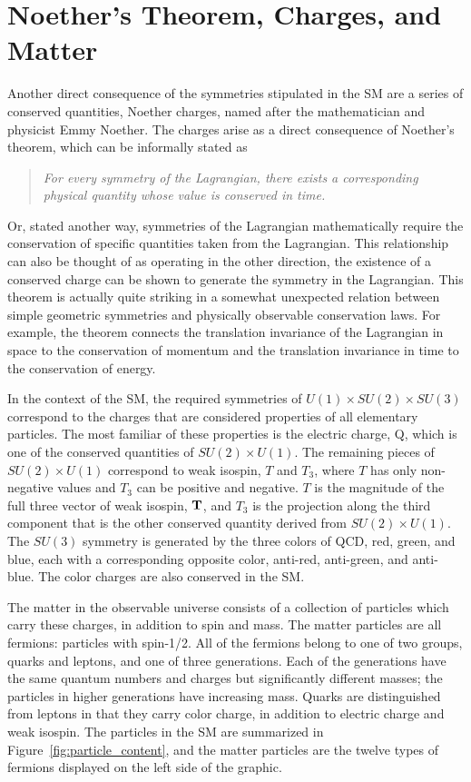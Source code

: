 \section{Noether's Theorem, Charges, and Matter}

Another direct consequence of the symmetries stipulated in the \ac{SM} are a series of conserved quantities, Noether charges, named after the mathematician and physicist Emmy Noether.
The charges arise as a direct consequence of Noether's theorem, which can be informally stated as 
\begin{quote}
\textit{For every symmetry of the Lagrangian, there exists a corresponding physical quantity whose value is conserved in time.}
\end{quote}
\noindent Or, stated another way, symmetries of the Lagrangian mathematically require the conservation of specific quantities taken from the Lagrangian. 
This relationship can also be thought of as operating in the other direction, the existence of a conserved charge can be shown to generate the symmetry in the Lagrangian.
This theorem is actually quite striking in a somewhat unexpected relation between simple geometric symmetries and physically observable conservation laws. 
For example, the theorem connects the translation invariance of the Lagrangian in space to the conservation of momentum and the translation invariance in time to the conservation of energy. 

In the context of the \ac{SM}, the required symmetries of $U(1)\times SU(2) \times SU(3)$ correspond to the charges that are considered properties of all elementary particles.
The most familiar of these properties is the electric charge, Q, which is one of the conserved quantities of $SU(2)\times U(1)$.
The remaining pieces of $SU(2)\times U(1)$ correspond to weak isospin, $T$ and $T_3$, where $T$ has only non-negative values and $T_3$ can be positive and negative.
$T$ is the magnitude of the full three vector of weak isospin, $\mathbf{T}$, and $T_3$ is the projection along the third component that is the other conserved quantity derived from $SU(2)\times U(1)$.
The $SU(3)$ symmetry is generated by the three colors of \ac{QCD}, red, green, and blue, each with a corresponding opposite color, anti-red, anti-green, and anti-blue.
The color charges are also conserved in the \ac{SM}.


The matter in the observable universe consists of a collection of particles which carry these charges, in addition to spin and mass.
The matter particles are all fermions: particles with spin-1/2.
All of the fermions belong to one of two groups, quarks and leptons, and one of three generations.
Each of the generations have the same quantum numbers and charges but significantly different masses; the particles in higher generations have increasing mass.
Quarks are distinguished from leptons in that they carry color charge, in addition to  electric charge and weak isospin.
The particles in the \ac{SM} are summarized in Figure~\ref{fig:particle_content}, and the matter particles are the twelve types of fermions displayed on the left side of the graphic.

